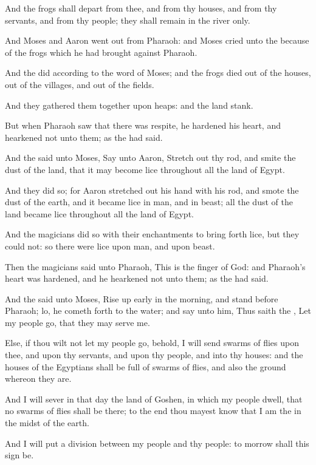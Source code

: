 \verse And the frogs shall depart from thee, and from thy houses, and from thy servants, and from thy people; they shall remain in the river only.

\verse And Moses and Aaron went out from Pharaoh: and Moses cried unto the \LORD because of the frogs which he had brought against Pharaoh.

\verse And the \LORD did according to the word of Moses; and the frogs died out of the houses, out of the villages, and out of the fields.

\verse And they gathered them together upon heaps: and the land stank.

\verse But when Pharaoh saw that there was respite, he hardened his heart, and hearkened not unto them; as the \LORD had said.

\verse And the \LORD said unto Moses, Say unto Aaron, Stretch out thy rod, and smite the dust of the land, that it may become lice throughout all the land of Egypt.

\verse And they did so; for Aaron stretched out his hand with his rod, and smote the dust of the earth, and it became lice in man, and in beast; all the dust of the land became lice throughout all the land of Egypt.

\verse And the magicians did so with their enchantments to bring forth lice, but they could not: so there were lice upon man, and upon beast.

\verse Then the magicians said unto Pharaoh, This is the finger of God: and Pharaoh's heart was hardened, and he hearkened not unto them; as the \LORD had said.

\verse And the \LORD said unto Moses, Rise up early in the morning, and stand before Pharaoh; lo, he cometh forth to the water; and say unto him, Thus saith the \LORD, Let my people go, that they may serve me.

\verse Else, if thou wilt not let my people go, behold, I will send swarms of flies upon thee, and upon thy servants, and upon thy people, and into thy houses: and the houses of the Egyptians shall be full of swarms of flies, and also the ground whereon they are.

\verse And I will sever in that day the land of Goshen, in which my people dwell, that no swarms of flies shall be there; to the end thou mayest know that I am the \LORD in the midst of the earth.

\verse And I will put a division between my people and thy people: to morrow shall this sign be.

